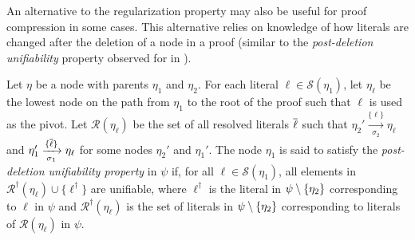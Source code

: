 An alternative to the regularization property may also be useful for proof compression in some cases. This alternative relies on knowledge of how literals are changed after the deletion of a node in a proof (similar to the \emph{post-deletion unifiability} property observed for {\FOLowerUnits} in \cite{GFOLU}).  
\begin{definition}\label{def:postdelprop}
Let $\eta$ be a node with parents $\eta_1$ and $\eta_2$. 
For each literal $\ell \in \mathcal{S}(\eta_1)$, let $\eta_\ell$ be the lowest node on the path from $\eta_1$ to the root of the proof such that $\ell$ is used as the pivot. %
Let $\mathcal{R}(\eta_\ell)$ be the set of all resolved literals $\overline{\ell}$ such that $\eta_2' \xrightarrow[\sigma_2]{\{\ell\} } \eta_\ell$ and $\eta_1' \xrightarrow[\sigma_1]{\{\overline{\ell}\} } \eta_\ell$ for some nodes $\eta_2'$ and $\eta_1'$.
The node $\eta_1$ is said to satisfy the \emph{post-deletion unifiability property} in $\psi$ if, for all $\ell \in \mathcal{S}(\eta_1)$, all elements in $\mathcal{R}^{\dagger}(\eta_\ell) \cup \{\ell^{\dagger}\}$ are unifiable, where $\ell^{\dagger}$ is the literal in $\psi \setminus \{\eta_2\}$ corresponding to $\ell$ in $\psi$ and $\mathcal{R}^{\dagger}(\eta_\ell)$ is the set of literals in $\psi \setminus \{\eta_2\}$ corresponding to literals of $\mathcal{R}(\eta_\ell)$ in $\psi$.
\end{definition}



